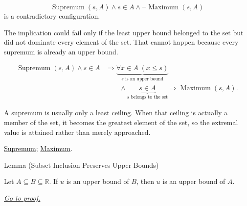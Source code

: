 \begin{remark*}
\[
\operatorname{Supremum}(s,A)\land s\in A\land \neg\operatorname{Maximum}(s,A)
\]
is a contradictory configuration.
\end{remark*}

\begin{remark*}
The implication could fail only if the least upper bound belonged to the set but did not dominate every element of the set. That cannot happen because every supremum is already an upper bound.
\end{remark*}

\begin{remark*}
\[
\begin{aligned}
\operatorname{Supremum}(s,A)\land s\in A
&\Longrightarrow
\underbrace{\forall x\in A\;(x\le s)}_{s\text{ is an upper bound}}\\
&\qquad\land
\underbrace{s\in A}_{s\text{ belongs to the set}}
\Longrightarrow
\operatorname{Maximum}(s,A).
\end{aligned}
\]
\end{remark*}

\begin{remark*}[Interpretation]
A supremum is usually only a least ceiling. When that ceiling is actually a member of the set, it becomes the greatest element of the set, so the extremal value is attained rather than merely approached.
\end{remark*}

\begin{remark*}[Dependencies]
\hyperref[def:supremum]{Supremum};
\hyperref[def:maximum]{Maximum}.
\end{remark*}








\begin{lemmabox}{Lemma (Subset Inclusion Preserves Upper Bounds)}
\begin{lemma}
\label{lem:subset-inclusion-preserves-upper-bounds}
Let $A\subseteq B\subseteq\mathbb{R}$. If $u$ is an upper bound of $B$, then $u$ is an upper bound of $A$.

\smallskip
\noindent
\hyperref[prf:subset-inclusion-preserves-upper-bounds]{\textit{Go to proof.}}
\end{lemma}
\end{lemmabox}

